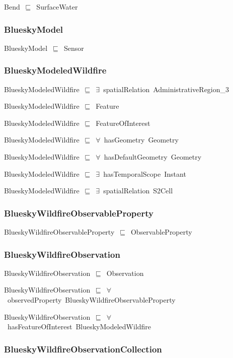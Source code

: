 \documentclass{article}
\begin{document}
Bend~\ensuremath{\sqsubseteq}~SurfaceWater~

\subsubsection*{BlueskyModel}

BlueskyModel~\ensuremath{\sqsubseteq}~Sensor~

\subsubsection*{BlueskyModeledWildfire}

BlueskyModeledWildfire~\ensuremath{\sqsubseteq}~\ensuremath{\exists}~spatialRelation~AdministrativeRegion\_3~

BlueskyModeledWildfire~\ensuremath{\sqsubseteq}~Feature~

BlueskyModeledWildfire~\ensuremath{\sqsubseteq}~FeatureOfInterest~

BlueskyModeledWildfire~\ensuremath{\sqsubseteq}~\ensuremath{\forall}~hasGeometry~Geometry~

BlueskyModeledWildfire~\ensuremath{\sqsubseteq}~\ensuremath{\forall}~hasDefaultGeometry~Geometry~

BlueskyModeledWildfire~\ensuremath{\sqsubseteq}~\ensuremath{\exists}~hasTemporalScope~Instant~

BlueskyModeledWildfire~\ensuremath{\sqsubseteq}~\ensuremath{\exists}~spatialRelation~S2Cell~

\subsubsection*{BlueskyWildfireObservableProperty}

BlueskyWildfireObservableProperty~\ensuremath{\sqsubseteq}~ObservableProperty~

\subsubsection*{BlueskyWildfireObservation}

BlueskyWildfireObservation~\ensuremath{\sqsubseteq}~Observation~

BlueskyWildfireObservation~\ensuremath{\sqsubseteq}~\ensuremath{\forall}~observedProperty~BlueskyWildfireObservableProperty~

BlueskyWildfireObservation~\ensuremath{\sqsubseteq}~\ensuremath{\forall}~hasFeatureOfInterest~BlueskyModeledWildfire~

\subsubsection*{BlueskyWildfireObservationCollection}
\end{document}
